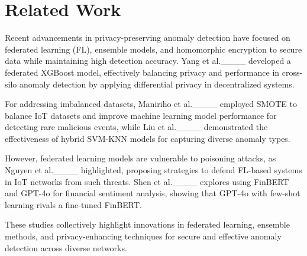 \section{Related Work}
Recent advancements in privacy-preserving anomaly detection have focused on federated learning (FL), ensemble models, and homomorphic encryption to secure data while maintaining high detection accuracy. Yang et al.____ developed a federated XGBoost model, effectively balancing privacy and performance in cross-silo anomaly detection by applying differential privacy in decentralized systems.

For addressing imbalanced datasets, Maniriho et al.____ employed SMOTE to balance IoT datasets and improve machine learning model performance for detecting rare malicious events, while Liu et al.____ demonstrated the effectiveness of hybrid SVM-KNN models for capturing diverse anomaly types.

However, federated learning models are vulnerable to poisoning attacks, as Nguyen et al.____ highlighted, proposing strategies to defend FL-based systems in IoT networks from such threats. Shen et al.____ explores using FinBERT and GPT-4o for financial sentiment analysis, showing that GPT-4o with few-shot learning rivals a fine-tuned FinBERT.

These studies collectively highlight innovations in federated learning, ensemble methods, and privacy-enhancing techniques for secure and effective anomaly detection across diverse networks.
